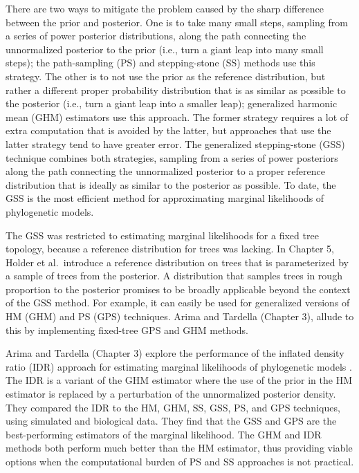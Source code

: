 \documentclass[letterpaper,12pt]{article}
\begin{document}
There are two ways to mitigate the problem caused by the sharp difference
between the prior and posterior.
One is to take many small steps, sampling from a series of power posterior
distributions, along the path connecting the unnormalized posterior to the
prior (i.e., turn a giant leap into many small steps);
the path-sampling (PS) \citep{Lartillot2006} and stepping-stone (SS)
\citep{Xie2011} methods use this strategy.
The other is to not use the prior as the reference distribution, but rather a
different proper probability distribution that is as similar as possible to the
posterior (i.e., turn a giant leap into a smaller leap); 
generalized harmonic mean (GHM) estimators \citep{Gelfand1994} use
this approach.
The former strategy requires a lot of extra computation that is avoided by the
latter, but approaches that use the latter strategy tend to have greater error.
The generalized stepping-stone (GSS) technique \citep{Fan2011} combines both
strategies, sampling from a series of power posteriors along the path
connecting the unnormalized posterior to a proper reference distribution that
is ideally as similar to the posterior as possible.
To date, the GSS is the most efficient method for approximating marginal
likelihoods of phylogenetic models.

The GSS was restricted to estimating marginal likelihoods for a fixed tree
topology, because a reference distribution for trees was lacking.
In Chapter 5, Holder et al.\ introduce a reference distribution on trees that
is parameterized by a sample of trees from the posterior.
A distribution that samples trees in rough proportion to the posterior promises
to be broadly applicable beyond the context of the GSS method.
For example, it can easily be used for generalized versions of HM (GHM) and PS
(GPS) techniques.
Arima and Tardella (Chapter 3), allude to this by implementing fixed-tree GPS
and GHM methods.


Arima and Tardella (Chapter 3) explore the performance of the inflated density
ratio (IDR) approach for estimating marginal likelihoods of phylogenetic models
\citep{Arima2012}.
The IDR is a variant of the GHM estimator where the use of the prior in the HM
estimator is replaced by a perturbation of the unnormalized posterior density.
They compared the IDR to the HM, GHM, SS, GSS, PS, and GPS techniques,
using simulated and biological data.
They find that the GSS and GPS are the best-performing estimators of the
marginal likelihood.
The GHM and IDR methods both perform much better than the HM estimator, thus
providing viable options when the computational burden of PS and SS approaches
is not practical.
\end{document}

